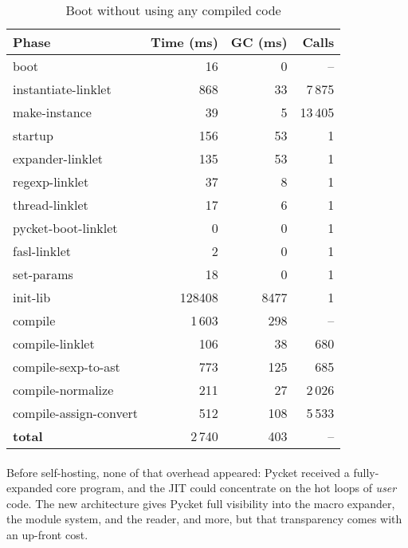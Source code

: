 		\begin{table}[ht]
		\centering
		\begin{tabular}{@{}lrrr@{}}
			\toprule
			Phase & Time (ms) & GC (ms) & Calls \\ \midrule
			boot                           &     16 &    0 & -- \\
			instantiate-linklet            &    868 &   33 & 7\,875 \\
			make-instance                  &     39 &    5 & 13\,405 \\
			startup                        &    156 &   53 & 1 \\
			\quad expander-linklet         &    135 &   53 & 1 \\
			\quad regexp-linklet                 &     37 &    8 & 1 \\
			\quad thread-linklet                 &     17 &    6 & 1 \\
			\quad pycket-boot-linklet            &      0 &    0 & 1 \\
			\quad fasl-linklet             &      2 &    0 & 1 \\
			\quad set-params               &     18 &    0 & 1 \\
			init-lib					   &	128408 &   8477 & 1 \\ \midrule
			compile                        &  1\,603 &  298 & -- \\
			\quad compile-linklet          &    106 &   38 & 680 \\
			\quad compile-sexp-to-ast      &    773 &  125 & 685 \\
			\quad compile-normalize        &    211 &   27 & 2\,026 \\
			\quad compile-assign-convert   &    512 &  108 & 5\,533 \\ \midrule
			\textbf{total}                 &  2\,740 &  403 & -- \\
			\bottomrule
		\end{tabular}
		\caption{Boot without using any compiled code}
		\label{tab:boot-no-compiled}
		\end{table}

		\paragraph{}%
			Before self-hosting, none of that overhead appeared: Pycket received a fully-expanded core program, and the JIT could concentrate on the hot loops of \emph{user} code. The new architecture gives Pycket full visibility into the macro expander, the module system, and the reader, and more, but that transparency comes with an up-front cost.

